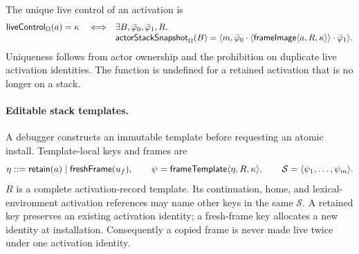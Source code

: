 The unique live control of an activation is
\begin{equation}\label{eq:live-activation-control}
\begin{split}
 \mathsf{liveControl}_{\Omega}(a)=\kappa
 \quad\Longleftrightarrow\quad&
 \exists B,\bar\varphi_0,\bar\varphi_1,R.\\[-1mm]
 &\mathsf{actorStackSnapshot}_{\Omega}(B)=
 \langle m,\bar\varphi_0\cdot
   \langle\mathsf{frameImage}\langle a,R,\kappa\rangle\rangle
   \cdot\bar\varphi_1\rangle.
\end{split}
\end{equation}
Uniqueness follows from actor ownership and the prohibition on duplicate live
activation identities.  The function is undefined for a retained activation
that is no longer on a stack.

\paragraph{Editable stack templates.}
A debugger constructs an immutable template before requesting an atomic
install.  Template-local keys and frames are
\begin{equation}\label{eq:stack-template-domain}
 \eta::=\mathsf{retain}(a)\mid\mathsf{freshFrame}(u_f),
 \qquad
 \psi=\mathsf{frameTemplate}\langle\eta,R,\kappa\rangle,
 \qquad
 \mathcal S=\langle\psi_1,\ldots,\psi_m\rangle.
\end{equation}
$R$ is a complete activation-record template.  Its continuation, home, and
lexical-environment activation references may name other keys in the same
$\mathcal S$.  A retained key preserves an existing activation identity; a
fresh-frame key allocates a new identity at installation.  Consequently a
copied frame is never made live twice under one activation identity.

